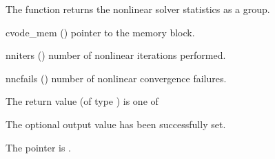 {
  The function  returns the
  {\cvodes} nonlinear solver statistics as a group.
}
{
  \begin{args}
  \item[cvode\_mem] ()
    pointer to the {\cvodes} memory block.
  \item[nniters] ()
    number of nonlinear iterations performed.
  \item[nncfails] ()
    number of nonlinear convergence failures.
  \end{args}
}
{
  The return value  (of type ) is one of
  \begin{args}
  \item[\Id{CV\_SUCCESS}] 
    The optional output value has been successfully set.
  \item[\Id{CV\_MEM\_NULL}]
    The  pointer is .
  \end{args}
}
{}


